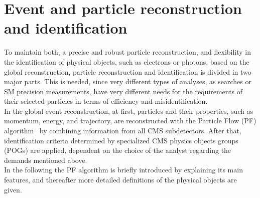 \section{Event and particle reconstruction and identification}\label{sec:reco}
To maintain both, a precise and robust particle reconstruction, and flexibility in the identification of physical objects, such as electrons or photons, based on the global reconstruction, particle reconstruction and identification is divided in two major parts. This is needed, since very different types of analyses, as searches or SM precision measurements, have very different needs for the requirements of their selected particles in terms of efficiency and misidentification.\\
In the global event reconstruction, at first, particles and their properties, such as momentum, energy, and trajectory, are reconstructed with the Particle Flow (PF) algorithm~\cite{ParticleFlow} by combining information from all CMS subdetectors. After that, identification criteria determined by specialized CMS physics objects groups (POGs) are applied, dependent on the choice of the analyst regarding the demands mentioned above.\\
In the following the PF algorithm is briefly introduced by explaining its main features, and thereafter more detailed definitions of the physical objects are given.

